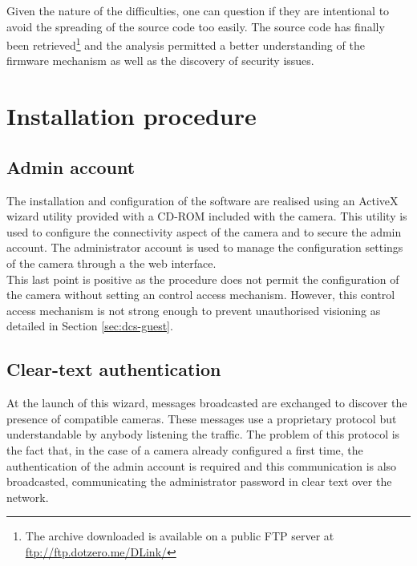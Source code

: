 Given the nature of the difficulties, one can question if they are intentional to avoid the spreading of the source code too easily.
The source code has finally been retrieved\footnote{The archive downloaded is available on a public FTP server at \url{ftp://ftp.dotzero.me/DLink/}} and the analysis permitted a better understanding of the firmware mechanism as well as the discovery of security issues.

\section{Installation procedure}
\label{sec:dcs-install}

\subsection{Admin account}

The installation and configuration of the software are realised using an ActiveX wizard utility provided with a CD-ROM included with the camera.
This utility is used to configure the connectivity aspect of the camera and to secure the admin account.
The administrator account is used to manage the configuration settings of the camera through a the web interface.\\

This last point is positive as the procedure does not permit the configuration of the camera without setting an control access mechanism.
However, this control access mechanism is not strong enough to prevent unauthorised visioning as detailed in Section \ref{sec:dcs-guest}.

\subsection{Clear-text authentication}
\label{sec:dcs-clearauth}

At the launch of this wizard, messages broadcasted are exchanged to discover the presence of compatible cameras.
These messages use a proprietary protocol but understandable by anybody listening the traffic.
The problem of this protocol is the fact that, in the case of a camera already configured a first time, the authentication of the admin account is required and this communication is also broadcasted, communicating the administrator password in clear text over the network.\\

